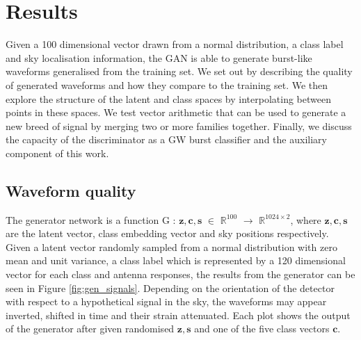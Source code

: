 \documentclass[12pt]{iopart}
\begin{document}
\section{Results}

Given a 100 dimensional vector drawn from a normal distribution, a class label and sky localisation information, the GAN is able to generate burst-like waveforms  generalised from the training set. We set out by describing the quality of generated waveforms and how they compare to the training set. We then explore the structure of the latent and class spaces by interpolating between points in these spaces. We test vector arithmetic that can be used to generate a new breed of signal by merging two or more families together. Finally, we discuss the capacity of the discriminator as a \ac{GW} burst classifier and the auxiliary component of this work. 

\subsection{Waveform quality}
The generator network is a function G : $\mathbf{z},\mathbf{c},\mathbb{\textbf{s}}$ $\in$ $\mathbb{R}^{100}$ $\to$ $\mathbb{R}^{1024\times2}$, where $\mathbf{z},\mathbf{c},\mathbb{\textbf{s}}$ are the latent vector, class embedding vector and sky positions respectively. Given a latent vector randomly sampled from a normal distribution with zero mean and unit variance, a class label which is represented by a 120 dimensional vector for each class and antenna responses, the results from the generator can be seen in Figure \ref{fig:gen_signals}. Depending on the orientation of the detector with respect to a hypothetical signal in the sky, the waveforms may appear inverted, shifted in time and their strain attenuated. Each plot shows the output of the generator after given randomised $\mathbf{z}, \mathbb{\textbf{s}}$ and one of the five class vectors $\mathbf{c}$.
\end{document}
